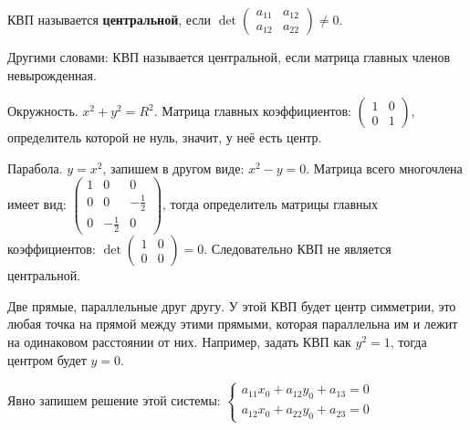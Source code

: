 \begin{Def}
	КВП называется \textbf{центральной}, если $
	\det 
	\left( \begin{array}{cccc}
		a_{11} & a_{12}\\
		a_{12} & a_{22}
		\end{array}\right) \neq 0$.
		
	Другими словами: КВП называется центральной, если матрица главных членов невырожденная.
\end{Def}

\begin{Example}
	\begin{MyList}
		\item Окружность. $x^2 + y^2 = R^2$. Матрица главных коэффициентов:
		$\left( \begin{array}{cccc}
			1 & 0\\
			0 & 1
			\end{array}\right)$, определитель которой не нуль, значит, у неё есть центр.
		\item Парабола. $y = x^2$, запишем в другом виде: $x^2 - y = 0$. Матрица всего многочлена имеет вид:
		$\left( \begin{array}{cccc}
			1 & 0 & 0\\
			0 & 0 & -\frac{1}{2}\\
			0 & -\frac{1}{2} & 0
			\end{array}\right)$, тогда определитель матрицы главных коэффициентов: 
		$\det \left( \begin{array}{cccc}
			1 & 0\\
			0 & 0
			\end{array}\right) = 0$. Следовательно КВП не является центральной.
		\item Две прямые, параллельные друг другу. У этой КВП будет центр симметрии, это любая точка на прямой между этими прямыми, которая параллельна им и лежит на одинаковом расстоянии от них. Например, задать КВП как $y^2 = 1$, тогда центром будет $y = 0$.
	\end{MyList}
 \end{Example}

 Явно запишем решение этой системы: 
 $\begin{cases}
	a_{11}x_0 + a_{12}y_0 + a_{13} = 0 \\
    a_{12}x_0 + a_{22}y_0 + a_{23} = 0
\end{cases}$ 

